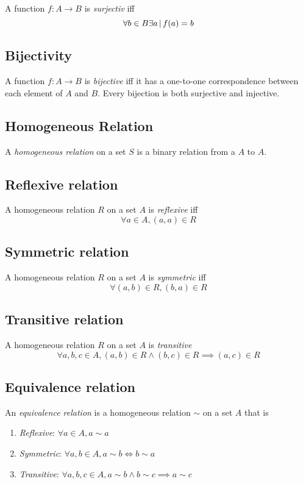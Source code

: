 \documentclass{article}
\begin{document}
A function \(f:A\to B\) is \textit{surjectiv} iff
\[
    \forall b \in B \exists a \,|\, f(a)=b
\]

\subsection{Bijectivity}

A function \(f:A\to B\) is \textit{bijective} iff
it has a one-to-one correspondence between each element of \(A\) and  \(B\).
Every bijection is both surjective and injective.

\subsection{Homogeneous Relation}

A \textit{homogeneous relation} on a set \(S\) is a binary relation
from a \(A\) to \(A\).

\subsection{Reflexive relation}

A homogeneous relation \(R\) on a set \(A\) is \textit{reflexive}
iff
\[
    \forall a\in A, (a,a) \in R
\]

\subsection{Symmetric relation}

A homogeneous relation \(R\) on a set \(A\) is \textit{symmetric}
iff
\[
    \forall (a,b) \in R, (b,a) \in R
\]

\subsection{Transitive relation}

A homogeneous relation \(R\) on a set \(A\) is \textit{transitive}
\[
    \forall a,b,c \in A, (a,b) \in R \land (b,c) \in R \implies (a,c) \in R 
\]

\subsection{Equivalence relation}

An \textit{equivalence relation} is a homogeneous relation \(\sim\) on a set \(A\)
that is
\begin{enumerate}
    \item \textit{Reflexive}: \(\forall a \in A, a \sim a\)
    \item \textit{Symmetric}: \(\forall a,b \in A, a \sim b \iff b \sim a\)
    \item \textit{Transitive}: \(\forall a,b,c \in A, a \sim b \land b \sim c \implies a \sim c\)
\end{enumerate}
\end{document}
